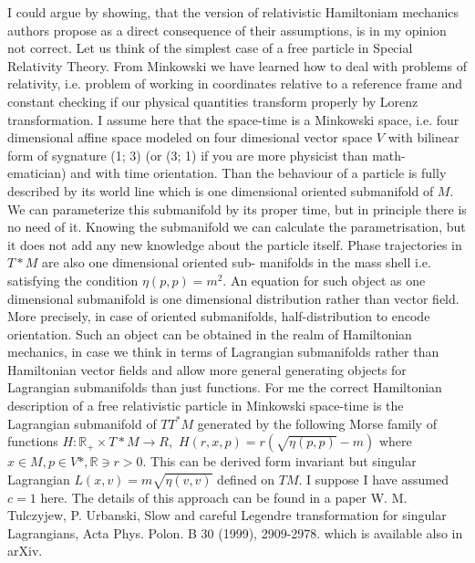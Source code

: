 \documentclass[10pt]{article}
\begin{document}
\begin{response}{I could argue by showing, that the version of relativistic Hamiltoniam
		mechanics authors propose as a direct consequence of their assumptions, is in my opinion
		not correct. Let us think of the simplest case of a free particle in Special Relativity Theory.
		From Minkowski we have learned how to deal with problems of relativity, i.e. problem of
		working in coordinates relative to a reference frame and constant checking if our physical
		quantities transform properly by Lorenz transformation. I assume here that the space-time
		is a Minkowski space, i.e. four dimensional affine space modeled on four dimesional vector space $V$ with bilinear form of sygnature (1; 3) (or (3; 1) if you are more physicist than math-
		ematician) and with time orientation. Than the behaviour of a particle is fully described
		by its world line which is one dimensional oriented submanifold of $M$. We can parameterize
		this submanifold by its proper time, but in principle there is no need of it. Knowing the
		submanifold we can calculate the parametrisation, but it does not add any new knowledge
		about the particle itself. Phase trajectories in $T*M$ are also one dimensional oriented sub-
		manifolds in the mass shell i.e. satisfying the condition $\eta(p, p) = m^2$. An equation for such
		object as one dimensional submanifold is one dimensional distribution rather than vector
		field. More precisely, in case of oriented submanifolds, half-distribution to encode orientation. Such an object can be obtained in the realm of Hamiltonian mechanics, in case we
		think in terms of Lagrangian submanifolds rather than Hamiltonian vector fields and allow
		more general generating objects for Lagrangian submanifolds than just functions. For me
		the correct Hamiltonian description of a free relativistic particle in Minkowski space-time is
		the Lagrangian submanifold of $TT^*M$ generated by the following Morse family of functions
		$H : \mathbb{R}_+ \times T*M \to R,$ $H(r, x, p) = r(
		\sqrt{\eta(p, p)} - m)$ where $x \in M, p \in V*, \mathbb{R} \ni r > 0$.
		This can be derived form invariant but singular Lagrangian $L(x, v) = m \sqrt{\eta(v, v)}$ defined
		on $TM$. I suppose I have assumed $c = 1$ here. The details of this approach can be found
		in a paper W. M. Tulczyjew, P. Urbanski, Slow and careful Legendre transformation for
		singular Lagrangians, Acta Phys. Polon. B 30 (1999), 2909-2978. which is available also
		in arXiv.}
\end{response}
\end{document}

